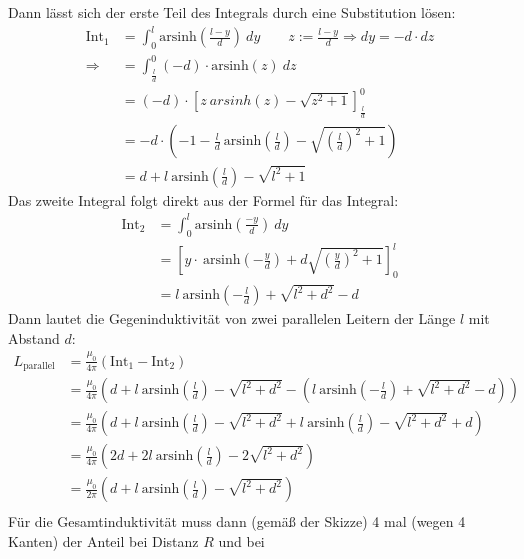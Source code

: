 \documentclass[11pt a4paper]{article}
\newcommand{\arsinh}{\text{arsinh}}
\begin{document}
\newpage
Dann lässt sich der erste Teil des Integrals durch eine Substitution lösen:
\begin{align*}
	\text{Int}_1 
	&= \int_0^l 
	\arsinh \left(\frac{l-y}{d}\right)
	 \ dy \qquad 
	z := \frac{l-y}{d} \Rightarrow dy = -d \cdot dz
	 \\
	\Rightarrow
	&= \int_{\frac{l}{d}}^0
	(-d) \cdot \arsinh \left( z \right)
	 \ dz \\
	&= (-d) \cdot \left[ z \ arsinh(z) - \sqrt{z^2 + 1} \right]_{\frac{l}{d}}^0 \\
	&= -d \cdot \left(-1 -\frac{l}{d} \ \arsinh \left(\frac{l}{d} \right) 
			- \sqrt{\left( \frac{l}{d}\right)^2 + 1} \right) \\
	&= d + l \ \arsinh \left(\frac{l}{d} \right) 
			- \sqrt{l^2 + 1}
\end{align*}
Das zweite Integral folgt direkt aus der Formel für das Integral:
\begin{align*}
	\text{Int}_2
	&= \int_0^l \arsinh \left(\frac{-y}{d} \right) \ dy \\
	&=  \left[ y \cdot \ \arsinh \left(-\frac{y}{d} \right) 
	+ d \sqrt{\left( \frac yd \right)^2 + 1} \right]_0^l \\
	&= l \ \arsinh \left(- \frac ld \right) + \sqrt{l^2 + d^2} - d
\end{align*}
Dann lautet die Gegeninduktivität von zwei parallelen Leitern der Länge $l$ mit Abstand $d$:
\begin{align*}
	L_\text{parallel} 
	&= \frac{\mu_0}{4\pi} \left( \text{Int}_1 - \text{Int}_2 \right) \\
	&= \frac{\mu_0}{4\pi} \left(
		d + l \ \arsinh \left(\frac{l}{d} \right) - \sqrt{l^2 + d^2} -
		\left(l \ \arsinh \left(- \frac ld \right) + \sqrt{l^2 + d^2} - d \right)
	\right) \\
	&= \frac{\mu_0}{4\pi} \left(
		d + l \ \arsinh \left(\frac{l}{d} \right) - \sqrt{l^2 + d^2}
		+ l \ \arsinh \left(\frac ld \right) - \sqrt{l^2 + d^2} + d
	\right) \\
	&= \frac{\mu_0}{4\pi} \left(
		2d + 2l \ \arsinh \left(\frac{l}{d} \right) - 2\sqrt{l^2 + d^2}
	\right) \\
	&= \frac{\mu_0}{2\pi} \left(
		d + l \ \arsinh \left(\frac{l}{d} \right) - \sqrt{l^2 + d^2}
	\right) \\
\end{align*}
Für die Gesamtinduktivität muss dann (gemäß der Skizze) 4 mal (wegen 4 Kanten) der Anteil bei Distanz $R$ und bei
\end{document}
